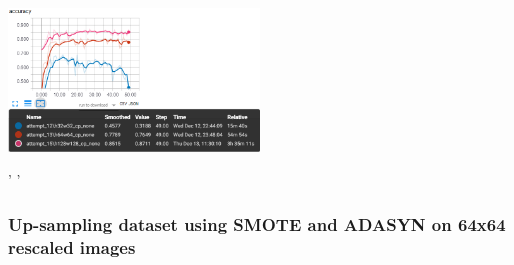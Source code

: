 \documentclass{article}
\begin{document}
\begin{minipage}[c]{\linewidth}
    \centering
	\includegraphics[width=0.5\textwidth]{./figures/acc_cp_none.png}
	
	' '\\
	\raggedright
	\subsubsection{Up-sampling dataset using SMOTE and ADASYN on 64x64 rescaled images}
	

\end{minipage}
\end{document}

